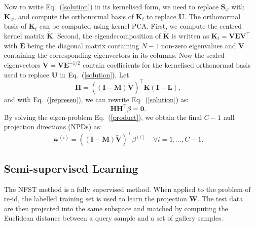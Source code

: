 \documentclass[10pt,twocolumn,letterpaper]{article}
\begin{document}
Now to write Eq.~(\ref{solution}) in its kernelised form, we need to replace $\mathbf{S}_{w}$ with $\mathbf{K}_{w}$, and compute the orthonormal basis of $\mathbf{K}_{t} $ to replace $\mathbf{U}$. The orthonormal basis of $\mathbf{K}_{t} $ can be computed using kernel PCA. First, we compute the centred kernel matrix $\widetilde{\mathbf{K}}$. Second, the eigendecomposition of $\widetilde{\mathbf{K}}$ is written as  $\mathbf{K}_{t} = \mathbf{V}\mathbf{E}\mathbf{V}^{\top} $ with $\mathbf{E}$ being
the diagonal matrix containing $N-1$ non-zero eigenvalues
and $\mathbf{V}$ containing the corresponding eigenvectors in its
columns. Now the scaled eigenvectors $\widetilde{\mathbf{V}} = \mathbf{V}\mathbf{E}^{-1/2}$ contain
coefficients for the kernelised orthonormal basis used to replace  $\mathbf{U}$ in  Eq.~(\ref{solution}). 
Let 
\begin{equation} 
\mathbf{H} = ((\mathbf{I} - \mathbf{M})\widetilde{\mathbf{V}})^{\top}\mathbf{K}(\mathbf{I}-\mathbf{L}),
\end{equation}
and with Eq.~(\ref{represen}), we can rewrite Eq.~(\ref{solution})
as:
\begin{equation}\label{product}
\mathbf{H}\mathbf{H}^{\top}\beta = \mathbf{0}.
\end{equation}
By solving the eigen-problem  Eq.~(\ref{product}), we obtain the final $C-1$ null projection directions (NPDs) as:
\begin{equation}\label{finalprojection} 
\mathbf{w}^{(i)} = ((\mathbf{I} - \mathbf{M})\widetilde{\mathbf{V}})^{\top}\beta ^{(i)} \quad \forall i=1,...,C-1.
\end{equation}


\subsection{Semi-supervised Learning}

The NFST method is a fully supervised method. When applied to the problem of re-id, the labelled training set is used to learn the projection $\mathbf{W}$. The test data are then projected into the same subspace and matched by computing the Euclidean distance between a query sample and a set of gallery samples. 
\end{document}

